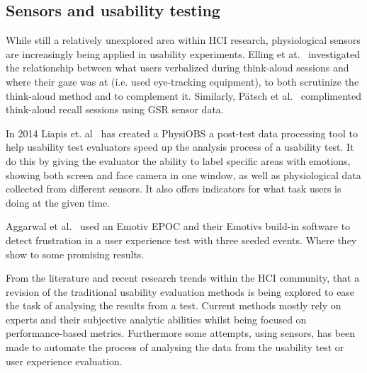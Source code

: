 \subsection{Sensors and usability testing}
While still a relatively unexplored area within HCI research,
physiological sensors are increasingly being applied in usability experiments.
Elling et at.~\cite{concurrent_think_aloud_eye_tracking} investigated the
relationship between what users verbalized during think-aloud sessions and where
their gaze was at (i.e. used eye-tracking equipment), to both scrutinize the
think-aloud method and to complement it. Similarly, P\"{a}tsch et
al.~\cite{using_sensor_graphs_think_aloud} complimented think-aloud recall
sessions using GSR sensor data.

In 2014 Liapis et. al~\cite{fusion4} has created a PhysiOBS a post-test data processing tool to help usability test evaluators speed up the analysis process of a usability test. It do this by giving the evaluator the ability to label specific areas with emotions, showing both screen and face camera in one window, as well as physiological data collected from different sensors. It also offers indicators for what task users is doing at the given time.

Aggarwal et al.~\cite{sensor_example} used an Emotiv EPOC and their Emotivs build-in software to detect frustration in a user experience test with three seeded events. Where they show to some promising results.

From the literature and recent research trends within the HCI community, that a revision of the traditional usability evaluation methods is being explored to ease the task of analysing the results from a test. Current methods mostly rely on experts and their subjective analytic abilities whilst being focused on performance-based metrics.
Furthermore some attempts, using sensors, has been made to automate the process of analysing the data from the usability test or user experience evaluation. 
